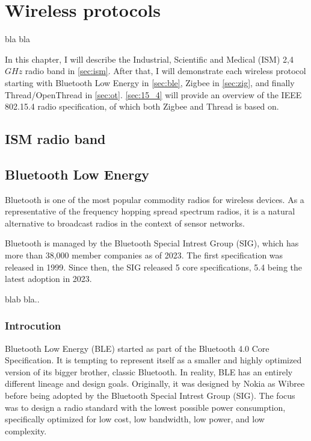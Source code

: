 \chapter{Wireless protocols}
\label{chap:wireless}

bla bla

In this chapter, I will describe the Industrial, Scientific and Medical (ISM) 2,4 \(GHz\) radio band in \autoref{sec:ism}.
After that, I will demonstrate each wireless protocol starting with Bluetooth Low Energy in \autoref{sec:ble},
Zigbee in \autoref{sec:zig}, and finally Thread/OpenThread in \autoref{sec:ot}.
\autoref{sec:15_4} will provide an overview of the IEEE 802.15.4 radio specification, of which both Zigbee and Thread is based on.

\section{ISM radio band}
\label{sec:ism}

\section{Bluetooth Low Energy}
\label{sec:ble}
Bluetooth is one of the most popular commodity radios for wireless devices.
As a representative of the frequency hopping spread spectrum radios,
it is a natural alternative to broadcast radios in the context of sensor networks. \cite{Leopold03}

Bluetooth is managed by the Bluetooth Special Intrest Group (SIG),
which has more than 38,000 member companies as of 2023. \cite{bt_history}
The first specification was released in 1999.
Since then, the SIG released 5 core specifications, 5.4 being the latest adoption in 2023. \cite{bt_spec_history}

blab bla.\cite{ble_primer23}.

\subsection{Introcution}
\label{ble:int}
Bluetooth Low Energy (BLE) started as part of the Bluetooth 4.0 Core Specification.
It is tempting to represent itself as a smaller and highly optimized version of its bigger brother, classic Bluetooth.
In reality, BLE has an entirely different lineage and design goals.
Originally, it was designed by Nokia as Wibree before being adopted by the Bluetooth Special Intrest Group (SIG).
The focus was to design a radio standard with the lowest possible power consumption, specifically optimized for low cost, low bandwidth, low power, and low complexity. \cite{Townsend14}

